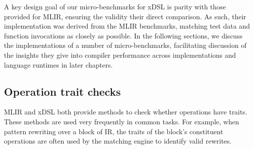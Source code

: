 A key design goal of our micro-benchmarks for xDSL is parity with those provided for MLIR, ensuring the validity their direct comparison.
As such, their implementation was derived from the MLIR benchmarks, matching test data and function invocations as closely as possible.
In the following sections, we discuss the implementations of a number of micro-benchmarks, facilitating discussion of the insights they give into compiler performance across implementations and language runtimes in later chapters.


\subsection{Operation trait checks}
\label{ssec:ubenchmark-trait-checks}

MLIR and xDSL both provide methods to check whether operations have traits.
These methods are used very frequently in common tasks. For example, when pattern rewriting over a block of IR, the traits of the block's constituent operations are often used by the matching engine to identify valid rewrites.


